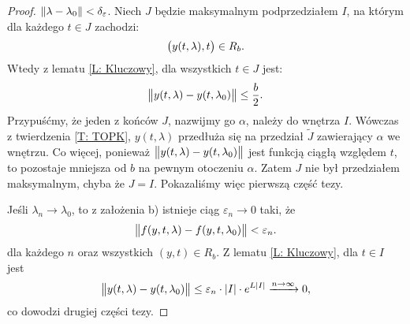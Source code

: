 \begin{proof}
  $\norm{\lambda - \lambda_0} < \delta_{\varepsilon}$.
  Niech $J$ będzie maksymalnym podprzedziałem $I$, na którym dla każdego $t \in J$ zachodzi:
%
  \begin{equation*}
    \p[\big]{ y(t,\lambda), t } \in R_b.
  \end{equation*}
%
  Wtedy z lematu \ref{L: Kluczowy}, dla wszystkich $t \in J$ jest:
%
  \begin{equation*}
    \norm[\big]{ y(t,\lambda) - y(t,\lambda_0) } \leq \frac b2.
  \end{equation*}
%
  Przypuśćmy, że jeden z końców $J$, nazwijmy go $\alpha$, należy do wnętrza $I$. Wówczas z twierdzenia \ref{T: TOPK}, 
  $y(t,\lambda)$ przedłuża się na przedział $\widetilde{J}$ zawierający $\alpha$ we wnętrzu. Co więcej, ponieważ 
  $\norm[\big]{ y(t,\lambda) - y(t,\lambda_0) }$ jest funkcją ciągłą względem $t$, to pozostaje mniejsza od $b$ na 
  pewnym otoczeniu $\alpha$. Zatem $J$ nie był przedziałem maksymalnym, chyba że $J = I$. Pokazaliśmy więc pierwszą 
  część tezy.
  
  Jeśli $\lambda_n \to \lambda_0$, to z założenia b) istnieje ciąg $\varepsilon_n \to 0$ taki, że
%
  \begin{equation*}
    \norm[\big]{ f(y,t,\lambda) - f(y,t,\lambda_0) } < \varepsilon_n.
  \end{equation*}
%
  dla każdego $n$ oraz wszystkich $(y,t) \in R_b$. Z lematu \ref{L: Kluczowy}, dla $t \in I$ jest
%
  \begin{equation*}
    \norm[\big]{ y(t,\lambda) - y(t,\lambda_0) } \leq \varepsilon_n \cdot \abs{I} \cdot e^{L \abs{I}}
    \xrightarrow{n\to\infty} 0,
  \end{equation*}
%
  co dowodzi drugiej części tezy.
\end{proof}



































